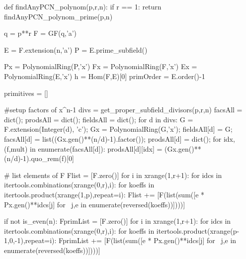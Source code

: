 \begin{sagecode}[caption={Aus \url{../Sage/findAnyPCN_trinom.spyx}},
  label=lst:findAnyPCN_polynom]
def findAnyPCN_polynom(p,r,n):
    if r == 1:
        return findAnyPCN_polynom_prime(p,n)

    q = p**r
    F = GF(q,'a')

    E = F.extension(n,'a')
    P = E.prime_subfield()

    Px = PolynomialRing(P,'x')
    Fx = PolynomialRing(F,'x')
    Ex = PolynomialRing(E,'x')
    h = Hom(F,E)[0]
    primOrder = E.order()-1
    
    primitives = []
    
    #setup factors of x^n-1
    divs = get_proper_subfield_divisors(p,r,n)
    facsAll = dict();
    prodsAll = dict();
    fieldsAll = dict();
    for d in divs:
        G = F.extension(Integer(d), 'c');
        Gx = PolynomialRing(G,'x');
        fieldsAll[d] = G;
        facsAll[d] = list((Gx.gen()**(n/d)-1).factor());
        prodsAll[d] = dict();
        for idx,(f,mult) in enumerate(facsAll[d]):
            prodsAll[d][idx] = (Gx.gen()**(n/d)-1).quo_rem(f)[0]

    # list elements of F
    Flist = [F.zero()]
    for i in xrange(1,r+1):
        for idcs in itertools.combinations(xrange(0,r),i):
            for koeffs in itertools.product(xrange(1,p),repeat=i):
                Flist += [F(list(sum([e * Px.gen()**idcs[j] for \
                        j,e in enumerate(reversed(koeffs))])))]

    if not is_even(n):
        FprimList = [F.zero()]
        for i in xrange(1,r+1):
            for idcs in itertools.combinations(xrange(0,r),i):
                for koeffs in itertools.product(xrange(p-1,0,-1),repeat=i):
                    FprimList += [F(list(sum([e * Px.gen()**idcs[j] for \
                            j,e in enumerate(reversed(koeffs))])))]


\end{sagecode}
